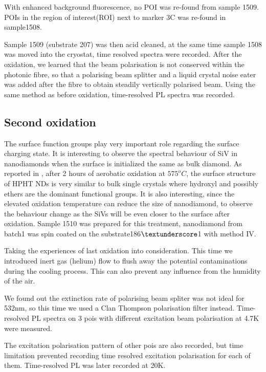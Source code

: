 With enhanced background fluorescence, no POI was re-found from sample 1509. POIs in the region of interest(ROI) next to marker 3C was re-found in sample1508. 

Sample 1509 (substrate 207) was then acid cleaned, at the same time sample 1508 was moved into the cryostat, time resolved spectra were recorded. After the oxidation, we learned that the beam polarisation is not conserved within the photonic fibre, so that a polarising beam splitter and a liquid crystal noise eater was added after the fibre to obtain steadily vertically polarised beam. Using the same method as before oxidation, time-resolved PL spectra was recorded.

\subsection[Second oxidation]{Second oxidation}

The surface function groups play very important role regarding the surface charging state. It is interesting to observe the spectral behaviour of SiV in nanodiamonds when the surface is initialized the same as bulk diamond. As reported in \cite{wolcott_surface_2014}, after 2 hours of aerobatic oxidation at $575^{o}C$, the surface structure of HPHT NDs is very similar to bulk single crystals where hydroxyl and possibly ethers are the dominant functional groups. It is also interesting, since the elevated oxidation temperature can reduce the size of nanodiamond, to observe the behaviour change as the SiVs will be even closer to the surface after oxidation. Sample 1510 was prepared for this treatment, nanodiamond from batch1 was spin coated on the substrate186$\textunderscore$1 with method IV.

Taking the experiences of last oxidation into consideration. This time we introduced inert gas (helium) flow to flush away the potential contaminations during the cooling process. This can also prevent any influence from the humidity of the air.

We found out the extinction rate of polarising beam spliter was not ideal for 532nm, so this time we used a Clan Thompson polarisation filter instead. Time-resolved PL spectra on 3 pois with different excitation beam polarisation at 4.7K were measured.

The excitation polarisation pattern of other pois are also recorded, but time limitation prevented recording time resolved excitation polarisation for each of them. Time-resolved PL was later recorded at 20K.

